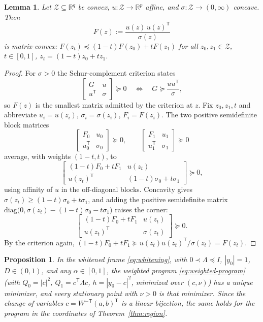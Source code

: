 \documentclass[11pt,onecolumn]{IEEEtran}
\newtheorem{proposition}[theorem]{Proposition}
\newtheorem{lemma}[theorem]{Lemma}
\newcommand{\R}{\mathbb{R}}
\begin{document}
\begin{lemma}\label{lem:mxconvex}
Let $\mathcal Z\subseteq\R^q$ be convex, $u:\mathcal Z\to\R^p$ affine,
and $\sigma:\mathcal Z\to(0,\infty)$ concave. Then
\[
F(z):=\frac{u(z)\,u(z)^{\mathsf T}}{\sigma(z)}
\]
is matrix-convex: $F(z_t)\preceq(1-t)F(z_0)+tF(z_1)$ for all
$z_0,z_1\in\mathcal Z$, $t\in[0,1]$, $z_t=(1-t)z_0+tz_1$.
\end{lemma}

\begin{proof}
For $\sigma>0$ the Schur-complement criterion \cite[Sec.~A.5.5]{boyd2004} states
\[
\begin{bmatrix}G&u\\ u^{\mathsf T}&\sigma\end{bmatrix}\succeq0
\quad\Longleftrightarrow\quad
G\succeq\frac{uu^{\mathsf T}}{\sigma},
\]
so $F(z)$ is the smallest matrix admitted by the criterion at $z$.
Fix $z_0,z_1,t$ and abbreviate $u_i=u(z_i)$, $\sigma_i=\sigma(z_i)$,
$F_i=F(z_i)$. The two positive semidefinite block matrices
\[
\begin{bmatrix}F_0&u_0\\ u_0^{\mathsf T}&\sigma_0\end{bmatrix}
\succeq0,
\qquad
\begin{bmatrix}F_1&u_1\\ u_1^{\mathsf T}&\sigma_1\end{bmatrix}
\succeq0
\]
average, with weights $(1-t,t)$, to
\[
\begin{bmatrix}
(1-t)F_0+tF_1&u(z_t)\\
u(z_t)^{\mathsf T}&(1-t)\sigma_0+t\sigma_1
\end{bmatrix}\succeq0,
\]
using affinity of $u$ in the off-diagonal blocks. Concavity gives
$\sigma(z_t)\ge(1-t)\sigma_0+t\sigma_1$, and adding the positive
semidefinite matrix
$\mathrm{diag}\bigl(0,\sigma(z_t)-(1-t)\sigma_0-t\sigma_1\bigr)$
raises the corner:
\[
\begin{bmatrix}
(1-t)F_0+tF_1&u(z_t)\\
u(z_t)^{\mathsf T}&\sigma(z_t)
\end{bmatrix}\succeq0 .
\]
By the criterion again,
$(1-t)F_0+tF_1\succeq u(z_t)u(z_t)^{\mathsf T}/\sigma(z_t)=F(z_t)$.
\end{proof}

\begin{proposition}\label{prop:uniq}
In the whitened frame \eqref{eq:whitening}, with $0\prec\Lambda\preceq
I$, $|y_0|=1$, $D\in(0,1)$, and any $\alpha\in[0,1]$, the weighted
program \eqref{eq:weighted-program} (with $Q_0=|c|^2$,
$Q_1=c^{\mathsf T}\Lambda c$, $h=|y_0-c|^2$, minimized over $(c,\nu)$)
has a unique minimizer, and every stationary point with $\nu>0$ is that
minimizer. Since the change of variables
$c=W^{-\mathsf T}(a,b)^{\mathsf T}$ is a linear bijection, the same
holds for the program in the coordinates of
Theorem~\ref{thm:region}.
\end{proposition}
\end{document}

